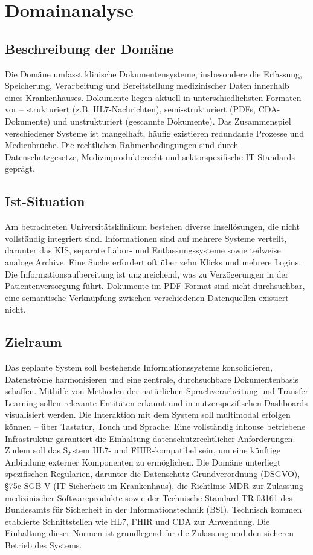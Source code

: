 \let\clearpage\relax
{\chapter{Domainanalyse}
\label{sec:domainanalyse}}
\section{Beschreibung der Domäne}
Die Domäne umfasst klinische Dokumentensysteme, insbesondere die Erfassung, Speicherung, Verarbeitung und Bereitstellung medizinischer Daten innerhalb eines Krankenhauses. Dokumente liegen aktuell in unterschiedlichsten Formaten vor – strukturiert (z.B. HL7-Nachrichten), semi-strukturiert (PDFs, CDA-Dokumente) und unstrukturiert (gescannte Dokumente). Das Zusammenspiel verschiedener Systeme ist mangelhaft, häufig existieren redundante Prozesse und Medienbrüche. Die rechtlichen Rahmenbedingungen sind durch Datenschutzgesetze, Medizinprodukterecht und sektorspezifische IT-Standards geprägt.
\section{Ist-Situation}
Am betrachteten Universitätsklinikum bestehen diverse Insellösungen, die nicht vollständig integriert sind. Informationen sind auf mehrere Systeme verteilt, darunter das KIS, separate Labor- und Entlassungssysteme sowie teilweise analoge Archive. Eine Suche erfordert oft über zehn Klicks und mehrere Logins. Die Informationsaufbereitung ist unzureichend, was zu Verzögerungen in der Patientenversorgung führt. Dokumente im PDF-Format sind nicht durchsuchbar, eine semantische Verknüpfung zwischen verschiedenen Datenquellen existiert nicht.
\section{Zielraum}
Das geplante System soll bestehende Informationssysteme konsolidieren, Datenströme harmonisieren und eine zentrale, durchsuchbare Dokumentenbasis schaffen. Mithilfe von Methoden der natürlichen Sprachverarbeitung und Transfer Learning sollen relevante Entitäten erkannt und in nutzerspezifischen Dashboards visualisiert werden. Die Interaktion mit dem System soll multimodal erfolgen können – über Tastatur, Touch und Sprache. Eine vollständig inhouse betriebene Infrastruktur garantiert die Einhaltung datenschutzrechtlicher Anforderungen. Zudem soll das System HL7- und FHIR-kompatibel sein, um eine künftige Anbindung externer Komponenten zu ermöglichen. Die Domäne unterliegt spezifischen Regularien, darunter die Datenschutz-Grundverordnung (DSGVO), §75c SGB V (IT-Sicherheit im Krankenhaus), die Richtlinie MDR zur Zulassung medizinischer Softwareprodukte sowie der Technische Standard TR-03161 des Bundesamts für Sicherheit in der Informationstechnik (BSI). Technisch kommen etablierte Schnittstellen wie HL7, FHIR und CDA zur Anwendung. Die Einhaltung dieser Normen ist grundlegend für die Zulassung und den sicheren Betrieb des Systems.

